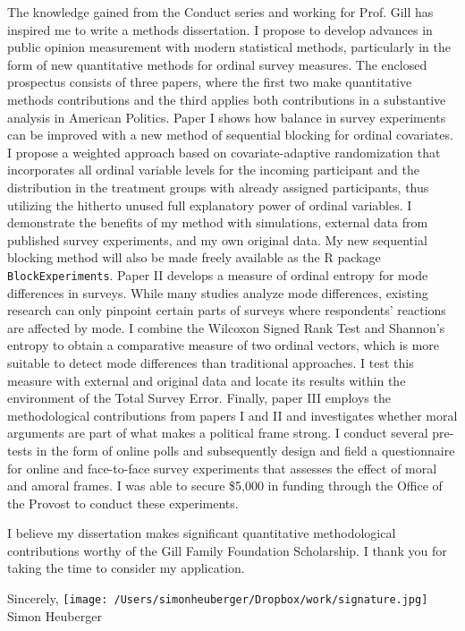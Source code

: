 \documentclass[10pt,letterpaper,dateno,sigleft]{newlfm}
\begin{document}
\begin{newlfm}
The knowledge gained from the Conduct series and working for Prof. Gill has inspired me to write a methods dissertation. I propose to develop advances in public opinion measurement with modern statistical methods, particularly in the form of new quantitative methods for ordinal survey measures. The enclosed prospectus consists of three papers, where the first two make quantitative methods contributions and the third applies both contributions in a substantive analysis in American Politics.
Paper I shows how balance in survey experiments can be improved with a new method of sequential blocking for ordinal covariates. I propose a weighted approach based on covariate-adaptive randomization that incorporates all ordinal variable levels for the incoming participant and the distribution in the treatment groups with already assigned participants, thus utilizing the hitherto unused full explanatory power of ordinal variables. I demonstrate the benefits of my method with simulations, external data from published survey experiments, and my own original data. My new sequential blocking method will also be made freely available as the R package {\tt BlockExperiments}. 
Paper II develops a measure of ordinal entropy for mode differences in surveys. While many studies analyze mode differences, existing research can only pinpoint certain parts of surveys where respondents' reactions are affected by mode. I combine the Wilcoxon Signed Rank Test and Shannon's entropy to obtain a comparative measure of two ordinal vectors, which is more suitable to detect mode differences than traditional approaches. I test this measure with external and original data and locate its results within the environment of the Total Survey Error.
Finally, paper III employs the methodological contributions from papers I and II and investigates whether moral arguments are part of what makes a political frame strong. I conduct several pre-tests in the form of online polls and subsequently design and field a questionnaire for online and face-to-face survey experiments that assesses the effect of moral and amoral frames. I was able to secure \$5,000 in funding through the Office of the Provost to conduct these experiments.

\vspace{0.15cm}
I believe my dissertation makes significant quantitative methodological contributions worthy of the Gill Family Foundation Scholarship. I thank you for taking the time to consider my application.

\vspace{0.15cm}

Sincerely, 
\newline \newline \texttt{[image: /Users/simonheuberger/Dropbox/work/signature.jpg]}
\newline Simon Heuberger


\end{newlfm}
\end{document}
